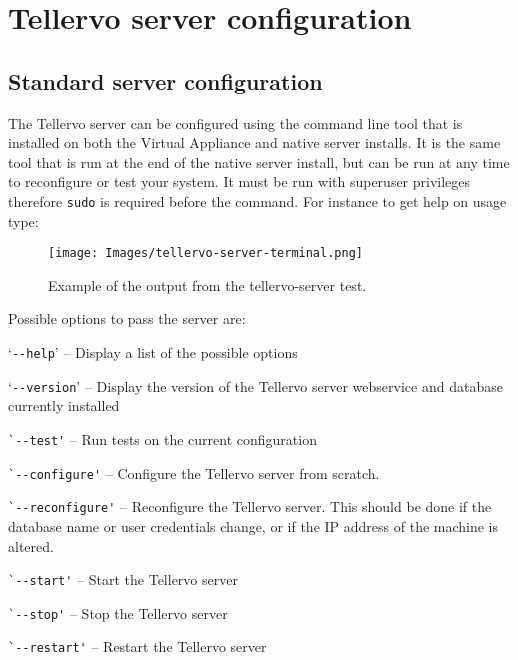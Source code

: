 \section{Tellervo server configuration}
\label{txt:serverConfig}
\subsection{Standard server configuration}
The Tellervo server can be configured using the command line tool that is installed on both the Virtual Appliance and native server installs.  It is the same tool that is run at the end of the native server install, but can be run at any time to reconfigure or test your system.  It must be run with superuser privileges therefore \verb|sudo| is required before the command.  For instance to get help on usage type:


\begin{wrapfigure}{r}{0.5\textwidth}
  \begin{center}
    \texttt{[image: Images/tellervo-server-terminal.png]}
  \end{center}
  \caption{Example of the output from the tellervo-server test.}
  \label{fig:serverTerminal}
\end{wrapfigure}

Possible options to pass the server are:

\begin{itemize*}
 \item `\verb|--help|' -- Display a list of the possible options
 \item `\verb|--version|' -- Display the version of the Tellervo server webservice and database currently installed
 \item \verb|`--test'| -- Run tests on the current configuration
 \item \verb|`--configure'| -- Configure the Tellervo server from scratch.  
 \item \verb|`--reconfigure'| -- Reconfigure the Tellervo server.  This should be done if the database name or user credentials change, or if the IP address of the machine is altered.
 \item \verb|`--start'| -- Start the Tellervo server
 \item \verb|`--stop'| -- Stop the Tellervo server
 \item \verb|`--restart'| -- Restart the Tellervo server
\end{itemize*} 


